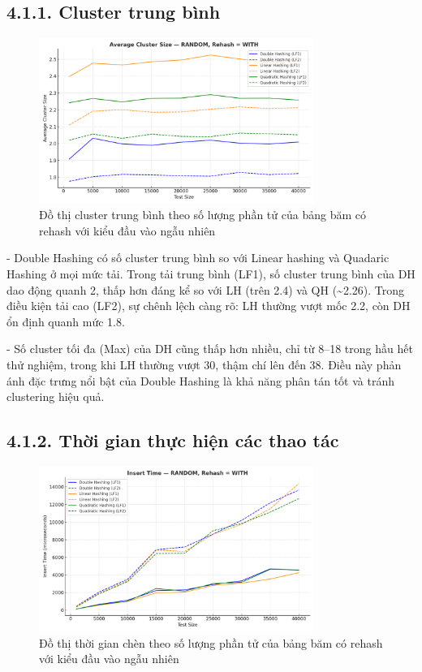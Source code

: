 \documentclass[12pt,a4paper]{report}
\begin{document}
\subsection*{4.1.1. Cluster trung bình}
\begin{figure}[!ht]
    \centering
    \includegraphics[width=0.8\textwidth]{ran_avr_clus.png}
    \caption{Đồ thị cluster trung bình theo số lượng phần tử của bảng băm có rehash với kiểu đầu vào ngẫu nhiên}
    \label{fig:flowchart}
\end{figure}
    -	Double Hashing có số cluster trung bình so với Linear hashing và Quadaric Hashing ở mọi mức tải. Trong tải trung bình (LF1), số cluster trung bình của DH dao động quanh 2, thấp hơn đáng kể so với LH (trên 2.4) và QH (\textasciitilde 2.26). Trong điều kiện tải cao (LF2), sự chênh lệch càng rõ: LH thường vượt mốc 2.2, còn DH ổn định quanh mức 1.8.
    
-	Số cluster tối đa (Max) của DH cũng thấp hơn nhiều, chỉ từ 8–18 trong hầu hết thử nghiệm, trong khi LH thường vượt 30, thậm chí lên đến 38. Điều này phản ánh đặc trưng nổi bật của Double Hashing là khả năng phân tán tốt và tránh clustering hiệu quả.
\newpage
\subsection*{4.1.2. Thời gian thực hiện các thao tác}
\begin{figure}[!ht]
    \centering
    \includegraphics[width=0.8\textwidth]{ran_ser_hash.png}
    \caption{Đồ thị thời gian chèn theo số lượng phần tử của bảng băm có rehash với kiểu đầu vào ngẫu nhiên}
    \label{fig:flowchart}
\end{figure}
\end{document}
